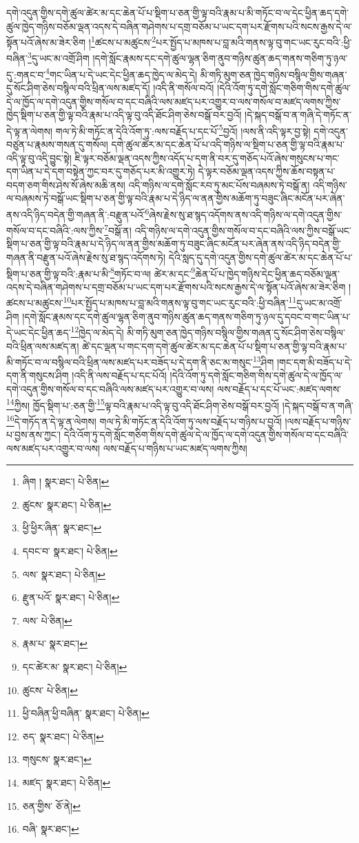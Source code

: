 དགེ་འདུན་གྱིས་དགེ་ཚུལ་ཚེར་མ་དང་ཆེན་པོ་པ་སྡིག་པ་ཅན་གྱི་ལྟ་བའི་རྣམ་པ་མི་གཏོང་བ་ལ་དེང་ཕྱིན་ཆད་དགེ་ཚུལ་ཁྱེད་གཉིས་བཅོམ་ལྡན་འདས་དེ་བཞིན་གཤེགས་པ་དགྲ་བཅོམ་པ་ཡང་དག་པར་རྫོགས་པའི་སངས་རྒྱས་དེ་ལ་སྟོན་པའོ་ཞེས་མ་ཟེར་ཅིག །\footnote{ཞིག །  སྣར་ཐང་།  པེ་ཅིན། }ཚངས་པ་མཚུངས་\footnote{ཚུངས་  སྣར་ཐང་།  པེ་ཅིན། }པར་སྤྱོད་པ་མཁས་པ་བླ་མའི་གནས་ལྟ་བུ་གང་ཡང་རུང་བའི་:ཕྱི་བཞིན་\footnote{ཕྱི་ཕྱིར་ཞིན་  སྣར་ཐང་། }དུ་ཡང་མ་འགྲོ་ཤིག །དགེ་སློང་རྣམས་དང་དགེ་ཚུལ་ལྷན་ཅིག་ནུབ་གཉིས་ཚུན་ཆད་གནས་གཅིག་ཏུ་ཉལ་དུ་:གནང་བ་\footnote{དབང་བ་  སྣར་ཐང་།  པེ་ཅིན། }གང་ཡིན་པ་དེ་ཡང་དེང་ཕྱིན་ཆད་ཁྱེད་ལ་མེད་དེ། མི་གཏི་མུག་ཅན་ཁྱེད་གཉིས་བསྙིལ་གྱིས་གཞན་དུ་སོང་ཤིག་ཅེས་བསྙིལ་བའི་ཕྲིན་ལས་མཛད་དོ། །འདི་ནི་གསོལ་བའོ། །དེའི་འོག་ཏུ་དགེ་སློང་གཅིག་གིས་དགེ་ཚུལ་དེ་ལ་ཁྱོད་ལ་དགེ་འདུན་གྱིས་གསོལ་བ་དང་བཞིའི་ལས་མཛད་པར་འགྱུར་བ་ལས་གསོལ་བ་མཛད་ལགས་ཀྱིས་ཁྱེད་སྡིག་པ་ཅན་གྱི་ལྟ་བའི་རྣམ་པ་འདི་ལྟ་བུ་འདི་ཐོང་ཤིག་ཅེས་བསྒོ་བར་བྱའོ། །དེ་སྐད་བསྒོ་བ་ན་གཞི་དེ་གཏོང་ན་དེ་ལྟ་ན་ལེགས། གལ་ཏེ་མི་གཏོང་ན་དེའི་འོག་ཏུ་:ལས་བརྗོད་པ་དང་པོ་\footnote{ལས་  སྣར་ཐང་།  པེ་ཅིན། }བྱའོ། །ལས་ནི་འདི་ལྟར་བྱ་སྟེ། དགེ་འདུན་བཙུན་པ་རྣམས་གསན་དུ་གསོལ། དགེ་ཚུལ་ཚེར་མ་དང་ཆེན་པོ་པ་འདི་གཉིས་ལ་སྡིག་པ་ཅན་གྱི་ལྟ་བའི་རྣམ་པ་འདི་ལྟ་བུ་འདི་བྱུང་སྟེ། ཇི་ལྟར་བཅོམ་ལྡན་འདས་ཀྱིས་འདོད་པ་དག་ནི་བར་དུ་གཅོད་པའོ་ཞེས་གསུངས་པ་གང་དག་ཡིན་པ་དེ་དག་བསྟེན་ཀྱང་བར་དུ་གཅོད་པར་མི་འགྱུར་ཏེ། དེ་ལྟར་བཅོམ་ལྡན་འདས་ཀྱིས་ཆོས་བསྟན་པ་བདག་ཅག་གིས་ཤེས་སོ་ཞེས་མཆི་ནས། འདི་གཉིས་ལ་དགེ་སློང་རབ་ཏུ་མང་པོས་བཞམས་ཏེ་བསྒོ་ན། འདི་གཉིས་ལ་བཞམས་ཏེ་བསྒོ་ཡང་སྡིག་པ་ཅན་གྱི་ལྟ་བའི་རྣམ་པ་དེ་ཉིད་ལ་ནན་གྱིས་མཆོག་ཏུ་བཟུང་ཞིང་མངོན་པར་ཞེན་ནས་འདི་ཉིད་བདེན་གྱི་གཞན་ནི་:བརྫུན་པའོ་\footnote{རྫུན་པའོ་  སྣར་ཐང་།  པེ་ཅིན། }ཞེས་རྗེས་སུ་ཐ་སྙད་འདོགས་ནས་འདི་གཉིས་ལ་དགེ་འདུན་གྱིས་གསོལ་བ་དང་བཞིའི་:ལས་ཀྱིས་\footnote{ལས་  པེ་ཅིན། }བསྒོ་ན། འདི་གཉིས་ལ་དགེ་འདུན་གྱིས་གསོལ་བ་དང་བཞིའི་ལས་ཀྱིས་བསྒོ་ཡང་སྡིག་པ་ཅན་གྱི་ལྟ་བའི་རྣམ་པ་དེ་ཉིད་ལ་ནན་གྱིས་མཆོག་ཏུ་བཟུང་ཞིང་མངོན་པར་ཞེན་ནས་འདི་ཉིད་བདེན་གྱི་གཞན་ནི་བརྫུན་པའོ་ཞེས་རྗེས་སུ་ཐ་སྙད་འདོགས་ཏེ། དེའི་སླད་དུ་དགེ་འདུན་གྱིས་དགེ་ཚུལ་ཚེར་མ་དང་ཆེན་པོ་པ་སྡིག་པ་ཅན་གྱི་ལྟ་བའི་:རྣམ་པ་མི་\footnote{རྣམ་པ་  སྣར་ཐང་། }གཏོང་བ་ལ། ཚེར་མ་དང་\footnote{དང་ཚེར་མ་  སྣར་ཐང་།  པེ་ཅིན། }ཆེན་པོ་པ་ཁྱེད་གཉིས་དེང་ཕྱིན་ཆད་བཅོམ་ལྡན་འདས་དེ་བཞིན་གཤེགས་པ་དགྲ་བཅོམ་པ་ཡང་དག་པར་རྫོགས་པའི་སངས་རྒྱས་དེ་ལ་སྟོན་པའོ་ཞེས་མ་ཟེར་ཅིག །ཚངས་པ་མཚུངས་\footnote{ཚུངས་  པེ་ཅིན། }པར་སྤྱོད་པ་མཁས་པ་བླ་མའི་གནས་ལྟ་བུ་གང་ཡང་རུང་བའི་:ཕྱི་བཞིན་\footnote{ཕྱི་བཞིན་ཕྱི་བཞིན་  སྣར་ཐང་།  པེ་ཅིན། }དུ་ཡང་མ་འགྲོ་ཤིག །དགེ་སློང་རྣམས་དང་དགེ་ཚུལ་ལྷན་ཅིག་ནུབ་གཉིས་ཚུན་ཆད་གནས་གཅིག་ཏུ་ཉལ་དུ་དབང་བ་གང་ཡིན་པ་དེ་ཡང་དེང་ཕྱིན་ཆད་\footnote{ཅད་  སྣར་ཐང་།  པེ་ཅིན། }ཁྱེད་ལ་མེད་དེ། མི་གཏི་མུག་ཅན་ཁྱེད་གཉིས་བསྙིལ་གྱིས་གཞན་དུ་སོང་ཤིག་ཅེས་བསྙིལ་བའི་ཕྲིན་ལས་མཛད་ན། ཚེ་དང་ལྡན་པ་གང་དག་དགེ་ཚུལ་ཚེར་མ་དང་ཆེན་པོ་པ་སྡིག་པ་ཅན་གྱི་ལྟ་བའི་རྣམ་པ་མི་གཏོང་བ་ལ་བསྙིལ་བའི་ཕྲིན་ལས་མཛད་པར་བཟོད་པ་དེ་དག་ནི་ཅང་མ་གསུང་\footnote{གསུངས་  སྣར་ཐང་། }ཤིག །གང་དག་མི་བཟོད་པ་དེ་དག་ནི་གསུངས་ཤིག །འདི་ནི་ལས་བརྗོད་པ་དང་པོའོ། །དེའི་འོག་ཏུ་དགེ་སློང་གཅིག་གིས་དགེ་ཚུལ་དེ་ལ་ཁྱོད་ལ་དགེ་འདུན་གྱིས་གསོལ་བ་དང་བཞིའི་ལས་མཛད་པར་འགྱུར་བ་ལས། ལས་བརྗོད་པ་དང་པོ་ཡང་:མཛད་ལགས་\footnote{མཛད་  སྣར་ཐང་།  པེ་ཅིན། }ཀྱིས། ཁྱོད་སྡིག་པ་:ཅན་གྱི་\footnote{ཅན་གྱིས་  ཅོ་ནེ། }ལྟ་བའི་རྣམ་པ་འདི་ལྟ་བུ་འདི་ཐོང་ཤིག་ཅེས་བསྒོ་བར་བྱའོ། །དེ་སྐད་བསྒོ་བ་ན་གཞི་\footnote{བཞི་  སྣར་ཐང་། }དེ་གཏོད་ན་དེ་ལྟ་ན་ལེགས། གལ་ཏེ་མི་གཏོང་ན་དེའི་འོག་ཏུ་ལས་བརྗོད་པ་གཉིས་པ་བྱའོ། །ལས་བརྗོད་པ་གཉིས་པ་བྱས་ནས་ཀྱང་། དེའི་འོག་ཏུ་དགེ་སློང་གཅིག་གིས་དགེ་ཚུལ་དེ་ལ་ཁྱོད་ལ་དགེ་འདུན་གྱིས་གསོལ་བ་དང་བཞིའི་ལས་མཛད་པར་འགྱུར་བ་ལས། ལས་བརྗོད་པ་གཉིས་པ་ཡང་མཛད་ལགས་ཀྱིས། 